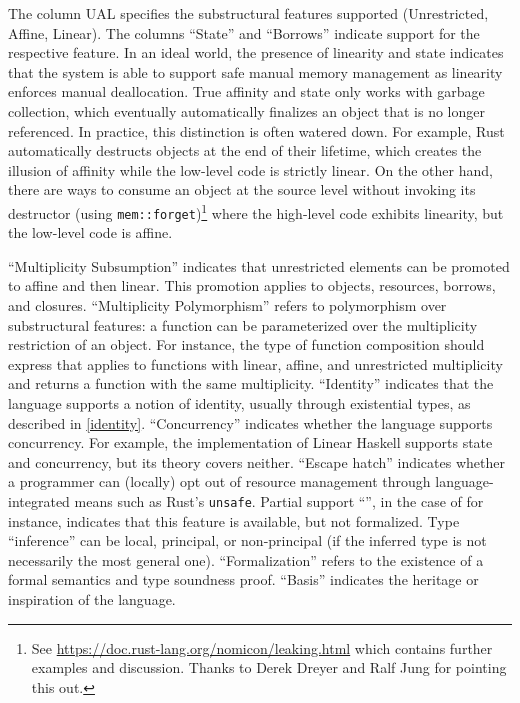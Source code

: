 The column UAL
specifies the substructural features supported (Unrestricted, Affine,
Linear). The columns ``State'' and ``Borrows'' indicate support for the respective
feature. In an ideal world, the presence of linearity and state
indicates that the system is able to support safe manual memory
management as linearity enforces manual deallocation. True affinity
and state only works with garbage collection, which eventually
automatically finalizes an object that is no longer referenced. In practice, this
distinction is often watered down. For example, Rust automatically
destructs objects at the end of their lifetime, which creates the
illusion of affinity while the low-level code is strictly linear. On
the other hand, there are ways to consume an object at the source
level without invoking its destructor (using
\lstinline/mem::forget/)\footnote{See
  \url{https://doc.rust-lang.org/nomicon/leaking.html} which contains
  further examples and discussion. Thanks to
  Derek Dreyer and Ralf Jung for pointing this out.}
where the high-level code exhibits linearity, but the low-level code
is affine.

``Multiplicity Subsumption'' indicates that unrestricted elements 
can be promoted to affine and then linear. This promotion applies to
objects, resources, borrows, and closures. ``Multiplicity Polymorphism'' refers to polymorphism over
substructural features: a function can be parameterized over the multiplicity
restriction of an object. For instance, the type of function
composition should express that applies to functions with linear,
affine, and unrestricted multiplicity and returns a function with the
same multiplicity. 
``Identity'' indicates that the language supports a notion
of identity, usually through existential types, as described in
\cref{identity}.
``Concurrency'' indicates whether the language supports
concurrency. For example, the implementation of Linear Haskell
supports state and concurrency, but its theory covers neither.
``Escape hatch'' indicates whether a programmer can (locally) opt out of
resource management through language-integrated means such
as Rust's \texttt{unsafe}. Partial support ``\M'', in the case of \lang
for instance, indicates that this feature is available, but not formalized.
Type ``inference''  can be local, principal, or non-principal (if the
inferred type is not necessarily the most general one). ``Formalization''
refers to the existence of a formal semantics and type soundness
proof. ``Basis'' indicates the heritage or inspiration of the language.

